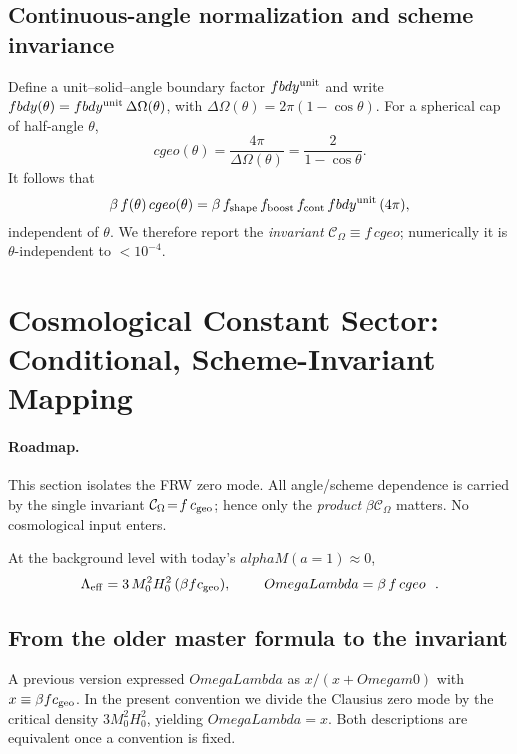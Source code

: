 \documentclass[aps,prd,onecolumn,superscriptaddress,nofootinbib]{revtex4-2}
\def\OmL{OmegaLambda}%
\def\Omm{Omega m0}%
\def\cgeo{cgeo}%
\def\alphaM{alphaM}%
\def\fbdy{fbdy}%
\def\boxed#1{#1}%
\newcommand{\OmL}{\Omega_\Lambda}
\newcommand{\Omm}{\Omega_{m0}}
\newcommand{\cgeo}{c_{\rm geo}}
\newcommand{\alphaM}{\alpha_M}
\newcommand{\fbdy}{f_{\rm bdy}}
\begin{document}
\subsection{Continuous-angle normalization and scheme invariance}
\label{sec:theta-invariance}
Define a unit--solid--angle boundary factor $\fbdy^{\rm unit}$ and write
$\fbdy(\theta)=\fbdy^{\rm unit}\,\Delta\Omega(\theta)$, with $\Delta\Omega(\theta)=2\pi(1-\cos\theta)$.
For a spherical cap of half-angle $\theta$,
\begin{equation}
\cgeo(\theta)=\frac{4\pi}{\Delta\Omega(\theta)}=\frac{2}{1-\cos\theta}.
\end{equation}
It follows that
\begin{equation}
\beta\,f(\theta)\,\cgeo(\theta)
= \beta\,f_{\rm shape}\,f_{\rm boost}\,f_{\rm cont}\,\fbdy^{\rm unit}\,(4\pi),
\end{equation}
independent of $\theta$. We therefore report the \emph{invariant} $\mathcal C_\Omega\equiv f\,\cgeo$; numerically it is $\theta$-independent to $<10^{-4}$.

\section{Cosmological Constant Sector: Conditional, Scheme-Invariant Mapping}
\label{sec:OmegaL}

\paragraph*{Roadmap.}
This section isolates the FRW zero mode. All angle/scheme dependence is carried by the single invariant $\mathcal C_\Omega\!=\!f\,c_{\rm geo}$; hence only the \emph{product} $\beta\mathcal C_\Omega$ matters. No cosmological input enters.

At the background level with today’s $\alphaM(a{=}1)\approx 0$,
\begin{equation}
\Lambda_{\rm eff} = 3\,M_0^2 H_0^2\,(\beta f c_{\rm geo}),\qquad
\boxed{\ \OmL = \beta\, f \, \cgeo\ }\ .
\end{equation}

\subsection{From the older master formula to the invariant}
A previous version expressed $\OmL$ as $x/(x+\Omm)$ with $x\equiv \beta f c_{\rm geo}$. In the present convention we divide the Clausius zero mode by the critical density $3M_0^2H_0^2$, yielding $\OmL=x$. Both descriptions are equivalent once a convention is fixed.
\end{document}
